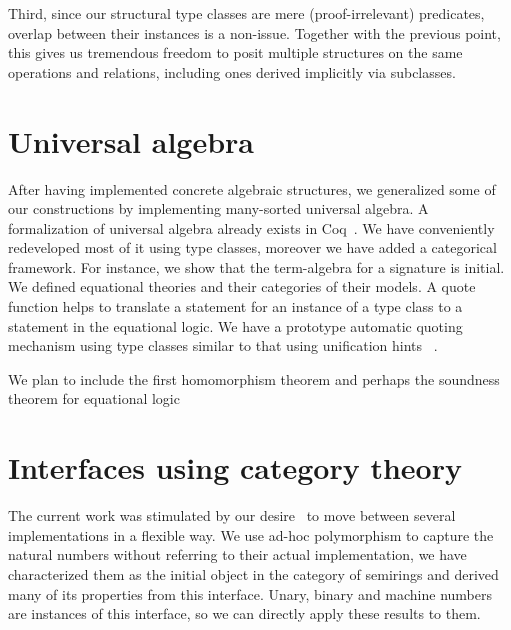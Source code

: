 \documentclass{llncs}
\begin{document}
Third, since our structural type classes are mere (proof-irrelevant) predicates, overlap between their instances is a non-issue. Together with the previous point, this gives us tremendous freedom to posit multiple structures on the same operations and relations, including ones derived implicitly via subclasses.



\section{Universal algebra}\label{univ}
After having implemented concrete algebraic structures, we generalized some of our constructions
by implementing many-sorted universal algebra. A formalization of universal algebra
already exists in Coq~\cite{DBLP:conf/tphol/Capretta99}. We have conveniently redeveloped most of it
using type classes, moreover we have added a categorical framework. For instance, we show that the
term-algebra for a signature is initial. We defined equational theories and their categories of
their models. A quote function helps to translate a statement for an instance of
a type class to a statement in the equational logic. We have a prototype automatic quoting mechanism
using type classes similar to that using unification hints~\cite{Hints} .

We plan to include the first homomorphism theorem and perhaps the soundness theorem for equational
logic


\section{Interfaces using category theory}\label{interfaces}\label{modul}
The current work was stimulated by our desire~\cite{Riemann} to move between several
implementations in a flexible way. We use ad-hoc polymorphism to capture the natural
numbers without referring to their actual implementation, we have
characterized them as the initial object in the category of semirings and derived many of its
properties from this interface. Unary, binary and machine numbers are
instances of this interface, so we can directly apply these results to them.
\end{document}
